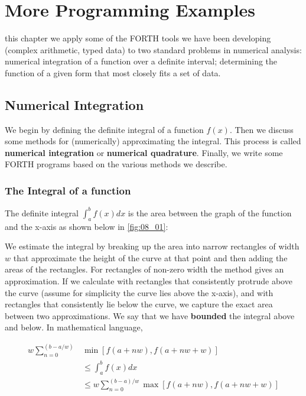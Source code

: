 
\chapter{More Programming Examples}\label{chap:08}

 this chapter we apply some of the FORTH tools we have been developing (complex arithmetic, typed data) to two standard problems in numerical analysis: numerical integration of a function over a definite interval; determining the function of a given form that most closely fits a set of data.

\section{Numerical Integration}
We begin by defining the definite integral of a function $f(x)$. Then we discuss some methods for (numerically) approximating the integral. This process is called \textbf{numerical integration} or \textbf{numerical quadrature}. Finally, we write some FORTH programs based on the various methods we describe.

\subsection{The Integral of a function}
The definite integral $\int_{a}^{b}f(x) dx$ is the area between the graph of the function and the x-axis as shown below in \ref{fig:08_01}:



We estimate the integral by breaking up the area into narrow rectangles of width $w$ that approximate the height of the curve at that point and then adding the areas of the rectangles. For rectangles of non-zero width the method gives an approximation. If we calculate with rectangles that consistently protrude above the curve (assume for simplicity the curve lies above the x-axis), and with rectangles that consistently lie below the curve, we capture the exact area between two approximations. We say that we have \textbf{bounded} the integral above and below. In mathematical language,

\begin{equation}
    \begin{split}
    w \sum_{n=0}^{(b-a/w)} & \min[f(a+nw),f(a+nw+w)] \\
    & \leq \int_{a}^{b}f(x) dx \\
    & \leq w \sum_{n=0}^{(b-a)/w} \max[f(a+nw),f(a+nw+w)]
    \end{split}
\end{equation}

